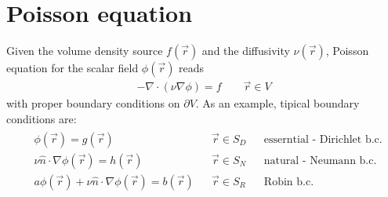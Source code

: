 \documentclass[letterpaper,10pt,english]{jupyterBook}
\begin{document}
\section{Poisson equation}
\label{\detokenize{ch/pde/elliptic:poisson-equation}}\label{\detokenize{ch/pde/elliptic:pde-elliptic-poisson}}
\sphinxAtStartPar
Given the volume density source \(f(\vec{r})\) and the diffusivity \(\nu(\vec{r})\), Poisson equation for the scalar field \(\phi(\vec{r})\) reads
\begin{equation*}
\begin{split}- \nabla \cdot ( \nu \nabla \phi) = f \qquad \vec{r} \in V\end{split}
\end{equation*}
\sphinxAtStartPar
with proper boundary conditions on \(\partial V\). As an example, tipical boundary conditions are:
\begin{equation*}
\begin{split}\begin{aligned}
  & \phi(\vec{r}) = g(\vec{r}) && \vec{r} \in S_D && \text{esserntial - Dirichlet b.c.}  \\
  & \nu \hat{n} \cdot \nabla \phi(\vec{r}) = h(\vec{r}) && \vec{r} \in S_N && \text{natural - Neumann b.c.}  \\
  & a \phi(\vec{r}) + \nu \hat{n} \cdot \nabla \phi(\vec{r}) = b(\vec{r}) && \vec{r} \in S_R && \text{Robin b.c.} \\
\end{aligned}\end{split}
\end{equation*}
\end{document}
